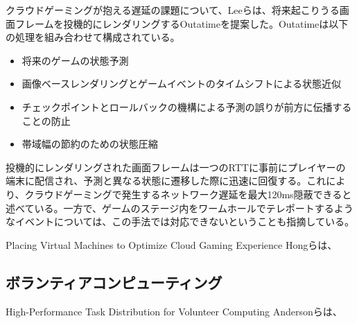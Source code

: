 クラウドゲーミングが抱える遅延の課題について、Leeら\cite{outatime}は、将来起こりうる画面フレームを投機的にレンダリングするOutatimeを提案した。Outatimeは以下の処理を組み合わせて構成されている。
\begin{itemize}
    \item 将来のゲームの状態予測
    \item 画像ベースレンダリングとゲームイベントのタイムシフトによる状態近似
    \item チェックポイントとロールバックの機構による予測の誤りが前方に伝播することの防止
    \item 帯域幅の節約のための状態圧縮
\end{itemize}
投機的にレンダリングされた画面フレームは一つのRTTに事前にプレイヤーの端末に配信され、予測と異なる状態に遷移した際に迅速に回復する。これにより、クラウドゲーミングで発生するネットワーク遅延を最大120ms隠蔽できると述べている。一方で、ゲームのステージ内をワームホールでテレポートするようなイベントについては、この手法では対応できないということも指摘している。

Placing Virtual Machines to Optimize
Cloud Gaming Experience
Hongら\cite{placing}は、


\subsection{ボランティアコンピューティング}
High-Performance Task Distribution for Volunteer Computing 
Andersonら\cite{boinc}は、



